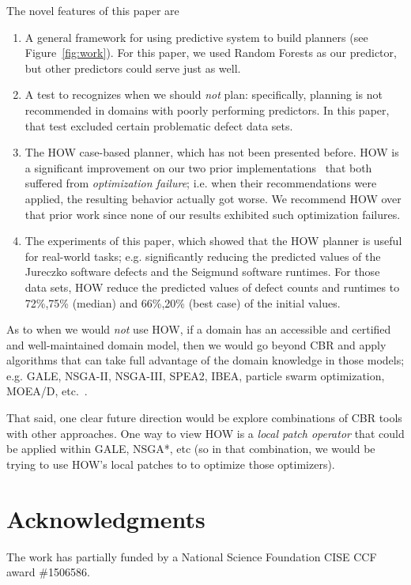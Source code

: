 \documentclass[conference]{IEEEtran}
\newcommand{\be}{\begin{enumerate}}
\newcommand{\ee}{\end{enumerate}}
\newcommand{\fig}[1]{Figure~\ref{fig:#1}}
\begin{document}
The novel features of this paper are
\be
\item A general framework for using  predictive system to build planners (see \fig{work}).
For this paper, we used Random Forests as our predictor, but other predictors could
serve just as well.
\item A  test to recognizes  when we should {\em not}  plan: specifically,
planning is
not recommended in domains with  poorly performing predictors. In this paper, that
test excluded certain problematic defect data sets.
\item The HOW  case-based planner, which has not been presented before. HOW
is a significant improvement on our two prior implementations~\cite{6600685,me12c} that both
suffered
from {\em optimization failure}; i.e. when their recommendations were applied,
the resulting behavior actually got worse. We recommend HOW over that prior work
since none of our results exhibited such optimization failures.
\item The experiments of this paper, which showed that 
the HOW planner is useful for real-world tasks;
e.g. significantly reducing the
predicted values of the Jureczko software defects and the Seigmund software runtimes.
For those data sets, HOW
reduce
 the predicted values of defect counts and  runtimes to    
 72\%,75\%  (median) and 66\%,20\% (best case) of the initial values.
\ee 
As to when we would {\em not} use HOW, if  a domain has an accessible
and certified and well-maintained
domain model, then we would go beyond CBR and apply algorithms that can take
full advantage of the domain knowledge in those models; e.g. GALE, NSGA-II, NSGA-III, SPEA2, IBEA, particle swarm optimization, MOEA/D, etc.~\cite{krall14,deb00a,zit02,zit04,%
deb14,Cui2005a,zhang07:TEC}. 

That said, one clear future direction would be explore
combinations of CBR tools with other approaches. 
One way to view HOW is a {\em local patch operator} that could be applied within 
GALE, NSGA*, etc (so in that combination, we would be trying to use   HOW's local patches to 
to optimize those optimizers).
 

\section*{Acknowledgments}

The work has partially funded by a National Science Foundation CISE CCF award \#1506586.
 
{}

\balance
\end{document}

